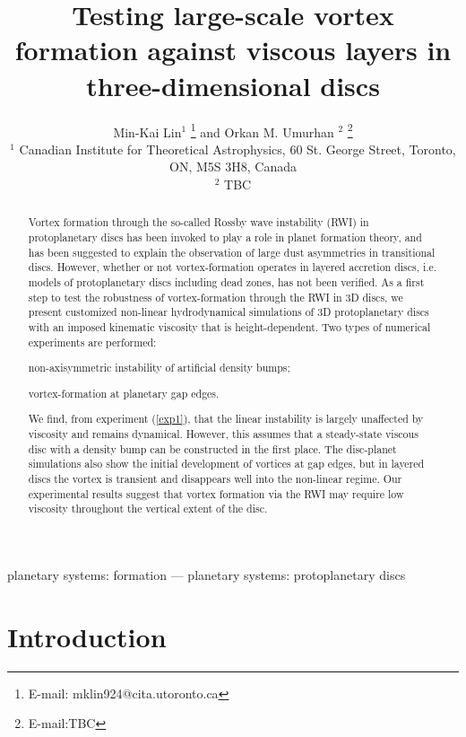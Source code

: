 \documentclass[useAMS,usenatbib]{mn2e}
\title[Vortices in viscous discs]{Testing large-scale 
  vortex formation against viscous layers in three-dimensional discs}
\author[Lin and Umurhan]{ Min-Kai Lin$^1$
  \thanks{E-mail: mklin924@cita.utoronto.ca} and Orkan M. Umurhan $^2$ \thanks{E-mail:TBC} \\
  $^1$ Canadian Institute for Theoretical Astrophysics,
  60 St. George Street, Toronto, ON, M5S 3H8, Canada \\
  $^2$ TBC
}
\begin{document}
\maketitle
\begin{abstract}
  Vortex formation through the so-called Rossby wave 
  instability (RWI) in protoplanetary discs has been invoked to play a
  role in planet formation theory, and has been suggested to explain
  the observation of large dust asymmetries in transitional discs.   
  However, whether or not vortex-formation operates in layered
  accretion discs, i.e. models of protoplanetary discs including dead zones, 
  has not been verified. As a first step to test the robustness of
  vortex-formation through the RWI in 3D discs, we present customized
  non-linear hydrodynamical
  simulations of 3D protoplanetary discs with an imposed kinematic
  viscosity that is height-dependent. Two types of numerical 
  experiments are performed:
  \begin{inparaenum}[(i)]
  \item non-axisymmetric instability of artificial
    density bumps;\label{exp1}  
  \item vortex-formation at planetary gap edges.%
  \end{inparaenum}
   We find, from experiment (\ref{exp1}), that the linear instability is
   largely unaffected by viscosity and remains dynamical.   
  However, this assumes that a steady-state viscous disc with a
  density bump can be constructed in the first place.  The disc-planet simulations  
  also show the initial development of vortices at gap edges, but in
  layered discs the vortex is transient and disappears  
  well into the non-linear regime. Our experimental results suggest that vortex
  formation via the RWI may require low viscosity throughout the 
  vertical extent of the disc. 
\end{abstract}

\begin{keywords}
planetary systems: formation --- planetary systems:
protoplanetary discs
\end{keywords}


\section{Introduction}\label{intro}

\end{document}
